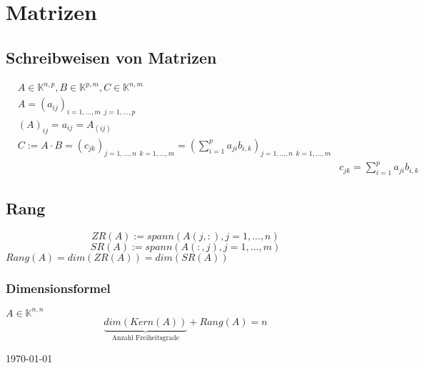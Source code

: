 \documentclass{scrartcl}
\begin{document}
	\section*{Matrizen}
	
	\subsection*{Schreibweisen von Matrizen}
		\begin{align*}
			&A \in \mathbb{K}^{n,p},
			B \in \mathbb{K}^{p,m},
			C \in \mathbb{K}^{n,m}
			\\
			&A = (a_{ij})_{i=1,...,m ~~ j=1,...,p}
			\\
			&(A)_{ij} = a_{ij} = A_{(ij)}
			\\
			&C := A \cdot B
				= (c_{jk})_{j=1,...,n ~~ k=1,...,m}
				= \left( \sum\limits_{i=1}^{p} a_{ji} b_{i,k} \right)_{j=1,...,n ~~ k=1,...,m}
			\\
			&&c_{jk}
				= \sum\limits_{i=1}^{p} a_{ji} b_{i,k}
		\end{align*}
	
	\subsection*{Rang}	
		\[
			ZR(A) := spann\left( A(j,:), j=1,...,n \right)
		\] 
		\[
			SR(A) := spann\left( A(:,j), j=1,...,m \right)
		\] 
		$Rang(A) = dim(ZR(A)) = dim(SR(A))$

		\subsubsection*{Dimensionsformel}
			$A \in \mathbb{K}^{n,n}$
			\[
				\underbrace{ dim( Kern(A) ) }_{\text{Anzahl Freiheitsgrade}} + Rang(A) = n
			\]	
		
		{\tiny
			\today
		}
\end{document}
